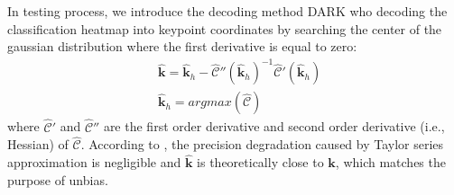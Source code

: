 \documentclass[10pt,journal,compsoc]{IEEEtran}
\begin{document}
In testing process, we introduce the decoding method DARK \cite{DARK} who decoding the classification heatmap into keypoint coordinates by searching the center of the gaussian distribution where the first derivative is equal to zero:
\begin{equation}
\label{eq:unbiaseddecodinggaussian}
    \begin{split}
    &\hat{\textbf{k}} = \hat{\textbf{k}}_h - \hat{\mathcal{C}}''(\hat{\textbf{k}}_h)^{-1}\hat{\mathcal{C}}'(\hat{\textbf{k}}_h)\\
    &\hat{\textbf{k}}_{h} = argmax(\hat{\mathcal{C}})
    \end{split}
\end{equation}
where $\hat{\mathcal{C}}'$ and $\hat{\mathcal{C}}''$ are the first order derivative and second order derivative (i.e., Hessian) of $\hat{\mathcal{C}}$. According to \cite{DARK}, the precision degradation caused by Taylor series approximation is negligible and $\hat{\textbf{k}}$ is theoretically close to $\textbf{k}$, which matches the purpose of unbias.
\end{document}
